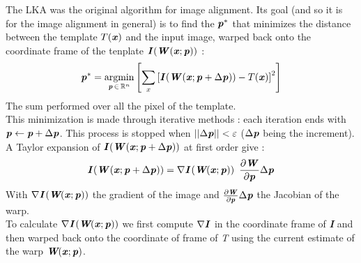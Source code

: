 \documentclass[a4paper,12pt]{report}
\newcommand{\argmin}{\mathop{\mathrm{argmin}}}
\newcommand{\bepar}[1]{
	\left( #1 \right)  
}
\newcommand{\becro}[1]{
	\left[ #1 \right]  
}
\numberwithin{equation}{section} %
\begin{document}
The LKA was the original algorithm for image alignment. Its goal (and so it is for the image alignment in general) is to find the $\textbf{\textit{p}}^*$ that minimizes the distance between the template $T(\textbf{\textit{x}})$ and the input image, warped back onto the coordinate frame of the tenplate $\textbf{\textit{I}}(\textbf{\textit{W}}(\textbf{\textit{x}}; \textbf{\textit{p}}))$ :
\begin{equation*}
\textbf{\textit{p}}^* = \underset{\textbf{\textit{p}}\, \in \, \mathbb{R}^n}{\argmin} \becro{\sum_x \becro{\textbf{\textit{I}}(\textbf{\textit{W}}(\textbf{\textit{x}}; \textbf{\textit{p}} + \Delta \textbf{\textit{p}})) - T(\textbf{\textit{x}})}^2}
\end{equation*}
The sum performed over all the pixel of the template.\\
This minimization is made through iterative methods : each iteration ends with $\textbf{\textit{p}} \leftarrow \textit{\textbf{p}} + \Delta \textbf{\textit{p}}$. This process is stopped when $\left\vert\left\vert \Delta \textbf{\textit{p}} \right\vert\right\vert  < \varepsilon$ ($\Delta \textbf{\textit{p}}$ being the increment).\\

A Taylor expansion of $\textbf{\textit{I}}(\textbf{\textit{W}}(\textbf{\textit{x}}; \textbf{\textit{p}} + \Delta \textbf{\textit{p}}))$ at first order give :
\begin{equation}
\textbf{\textit{I}}(\textbf{\textit{W}}(\textbf{\textit{x}}; \textbf{\textit{p}} + \Delta \textbf{\textit{p}})) =  \nabla \textit{\textbf{I}}\bepar{\textit{\textbf{W}}(\textbf{\textit{x}}; \textbf{\textit{p}})}\ \frac{\partial \textbf{\textit{W}}}{\partial \textbf{\textit{p}}} \Delta \textbf{\textit{p}}
\end{equation}
With $\nabla \textit{\textbf{I}}\bepar{\textit{\textbf{W}}(\textbf{\textit{x}}; \textbf{\textit{p}})}$ the gradient of the image and $\frac{\partial \textbf{\textit{W}}}{\partial \textbf{\textit{p}}} \Delta \textbf{\textit{p}}$ the Jacobian of the warp.\\

To calculate $\nabla \textit{\textbf{I}}\bepar{\textit{\textbf{W}}(\textbf{\textit{x}}; \textbf{\textit{p}})}$ we first compute $\nabla \textbf{\textit{I}}$ in the coordinate frame of \textit{\textbf{I}} and then warped back onto the coordinate of frame of \textit{T} using the current estimate of the warp $\textit{\textbf{W}}(\textbf{\textit{x}}; \textbf{\textit{p}})$.\\
\end{document}
